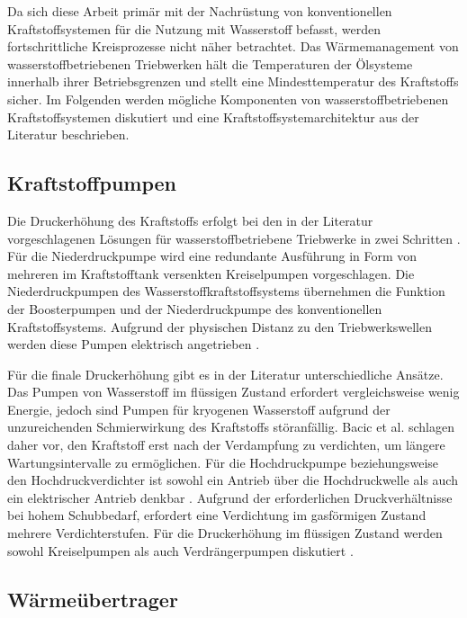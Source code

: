 Da sich diese Arbeit primär mit der Nachrüstung von konventionellen Kraftstoffsystemen für die Nutzung mit Wasserstoff befasst, werden fortschrittliche Kreisprozesse nicht näher betrachtet. Das Wärmemanagement von wasserstoffbetriebenen Triebwerken hält die Temperaturen der Ölsysteme innerhalb ihrer Betriebsgrenzen und stellt eine Mindesttemperatur des Kraftstoffs sicher. Im Folgenden werden mögliche Komponenten von wasserstoffbetriebenen Kraftstoffsystemen diskutiert und eine Kraftstoffsystemarchitektur aus der Literatur beschrieben.

\subsection{Kraftstoffpumpen}

Die Druckerhöhung des Kraftstoffs erfolgt bei den in der Literatur vorgeschlagenen Lösungen für wasserstoffbetriebene Triebwerke in zwei Schritten \cite{Ebrahimi.2024}. Für die Niederdruckpumpe wird eine redundante Ausführung in Form von mehreren im Kraftstofftank versenkten Kreiselpumpen vorgeschlagen. Die Niederdruckpumpen des Wasserstoffkraftstoffsystems übernehmen die Funktion der Boosterpumpen und der Niederdruckpumpe des konventionellen Kraftstoffsystems. Aufgrund der physischen Distanz zu den Triebwerkswellen werden diese Pumpen elektrisch angetrieben \cite{Scholz.2003}. 

Für die finale Druckerhöhung gibt es in der Literatur unterschiedliche Ansätze. Das Pumpen von Wasserstoff im flüssigen Zustand erfordert vergleichsweise wenig Energie, jedoch sind Pumpen für kryogenen Wasserstoff aufgrund der unzureichenden Schmierwirkung des Kraftstoffs störanfällig. Bacic et al. \cite{BacicMarkoCoullJohn.2024} schlagen daher  vor, den Kraftstoff erst nach der Verdampfung zu verdichten, um längere Wartungsintervalle zu ermöglichen. Für die Hochdruckpumpe beziehungsweise den Hochdruckverdichter ist sowohl ein Antrieb  über die Hochdruckwelle als auch ein elektrischer Antrieb denkbar \cite{Scholz.2003}. Aufgrund der erforderlichen Druckverhältnisse bei hohem Schubbedarf, erfordert eine Verdichtung im gasförmigen Zustand mehrere Verdichterstufen. Für die Druckerhöhung im flüssigen Zustand werden sowohl Kreiselpumpen als auch Verdrängerpumpen diskutiert \cite{Scholz.2003, Shaffer.2014, Cryoplane2003}.

\subsection{Wärmeübertrager}

